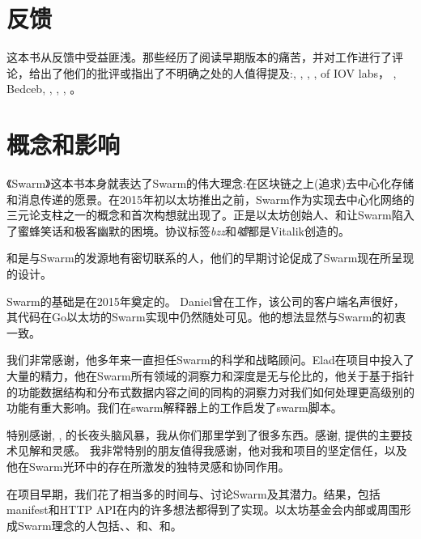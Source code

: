 \section*{反馈}

这本书从反馈中受益匪浅。那些经历了阅读早期版本的痛苦，并对工作进行了评论，给出了他们的批评或指出了不明确之处的人值得提及:, , , ,  of IOV labs， 
 , 
Bedceb, , , , 。



\section*{概念和影响}

《Swarm》这本书本身就表达了Swarm的伟大理念:在区块链之上(追求)去中心化存储和消息传递的愿景。在2015年初以太坊推出之前，Swarm作为实现去中心化网络的三元论支柱之一的概念和首次构想就出现了。正是以太坊创始人、和让Swarm陷入了蜜蜂笑话和极客幽默的困境。协议标签\emph{bzz}和\emph{嘘}都是Vitalik创造的。 

和是与Swarm的发源地有密切联系的人，他们的早期讨论促成了Swarm现在所呈现的设计。

Swarm的基础是在2015年奠定的。
Daniel曾在工作，该公司的客户端名声很好，其代码在Go以太坊的Swarm实现中仍然随处可见。他的想法显然与Swarm的初衷一致。 

我们非常感谢，他多年来一直担任Swarm的科学和战略顾问。Elad在项目中投入了大量的精力，他在Swarm所有领域的洞察力和深度是无与伦比的，他关于基于指针的功能数据结构和分布式数据内容之间的同构的洞察力对我们如何处理更高级别的功能有重大影响。我们在swarm解释器上的工作启发了swarm脚本。

特别感谢, , 的长夜头脑风暴，我从你们那里学到了很多东西。感谢, 提供的主要技术见解和灵感。
我非常特别的朋友值得我感谢，他对我和项目的坚定信任，以及他在Swarm光环中的存在所激发的独特灵感和协同作用。

在项目早期，我们花了相当多的时间与、讨论Swarm及其潜力。结果，包括manifest和HTTP API在内的许多想法都得到了实现。以太坊基金会内部或周围形成Swarm理念的人包括、、和、和。 

